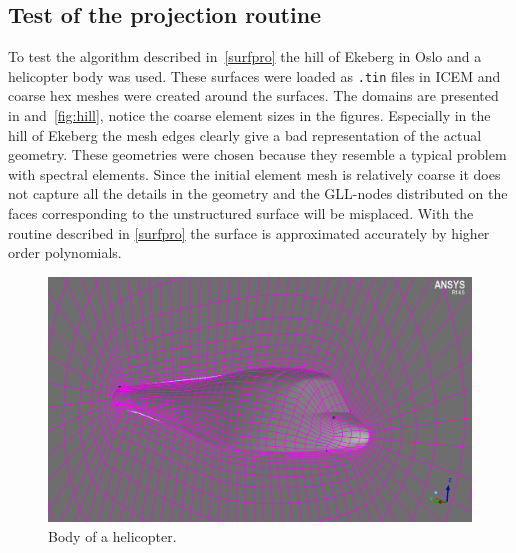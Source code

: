 \subsection{Test of the projection routine}
To test the algorithm described in~\cref{surfpro} the hill of Ekeberg in Oslo 
and a helicopter body was used. These surfaces were loaded as \verb|.tin| files in ICEM and coarse hex meshes were created 
around the surfaces. The domains are presented in 
 and~\ref{fig:hill}, notice the coarse element sizes in the figures.
Especially in the hill of Ekeberg the mesh edges clearly give a bad representation of the actual geometry.
These geometries were chosen because they resemble a typical problem with 
spectral elements. Since the initial element mesh is relatively coarse it does not capture all 
the details in the geometry and the GLL-nodes distributed on the faces corresponding to the 
unstructured surface will be misplaced. 
With the routine described in \cref{surfpro} the surface is approximated accurately 
by higher order polynomials. 
%
%
%
\begin{figure}[h]
    \centering
  \includegraphics[width=0.7\linewidth]{Figures/helicopter.jpg}
	\caption{Body of a helicopter.}
	\label{fig:heli}
\end{figure}

